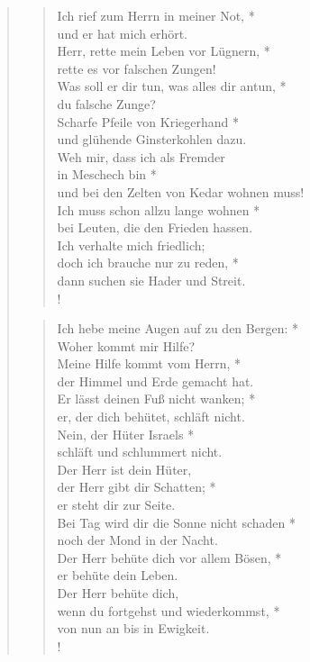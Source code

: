 \begin{quote}
\begin{verse}


\smallskip

Ich rief zum Herrn in meiner Not, *\\
und er hat mich erhört.\\
\vin Herr, rette mein Leben vor Lügnern, *\\
\vin rette es vor falschen Zungen!\\
Was soll er dir tun, was alles dir antun, *\\
du falsche Zunge?\\
\vin Scharfe Pfeile von Kriegerhand *\\
\vin und glühende Ginsterkohlen dazu.\\
Weh mir, dass ich als Fremder\\
in Meschech bin *\\
und bei den Zelten von Kedar wohnen muss!\\
\vin Ich muss schon allzu lange wohnen *\\
\vin bei Leuten, die den Frieden hassen.\\
Ich verhalte mich friedlich;\\
doch ich brauche nur zu reden, *\\
dann suchen sie Hader und Streit.\\!

\end{verse}

\newpage

\begin{verse}


\smallskip


Ich hebe meine Augen auf zu den Bergen: *\\
Woher kommt mir Hilfe?\\
\vin Meine Hilfe kommt vom Herrn, *\\
\vin der Himmel und Erde gemacht hat.\\
Er lässt deinen Fuß nicht wanken; *\\
er, der dich behütet, schläft nicht.\\
\vin Nein, der Hüter Israels *\\
\vin schläft und schlummert nicht.\\
Der Herr ist dein Hüter, \\
der Herr gibt dir Schatten; *\\
er steht dir zur Seite.\\
\vin Bei Tag wird dir die Sonne nicht schaden *\\
\vin noch der Mond in der Nacht.\\
Der Herr behüte dich vor allem Bösen, *\\
er behüte dein Leben.\\
\vin Der Herr behüte dich,\\
\vin wenn du fortgehst und wiederkommst, *\\
\vin von nun an bis in Ewigkeit.\\!


\end{verse}
\end{quote}
